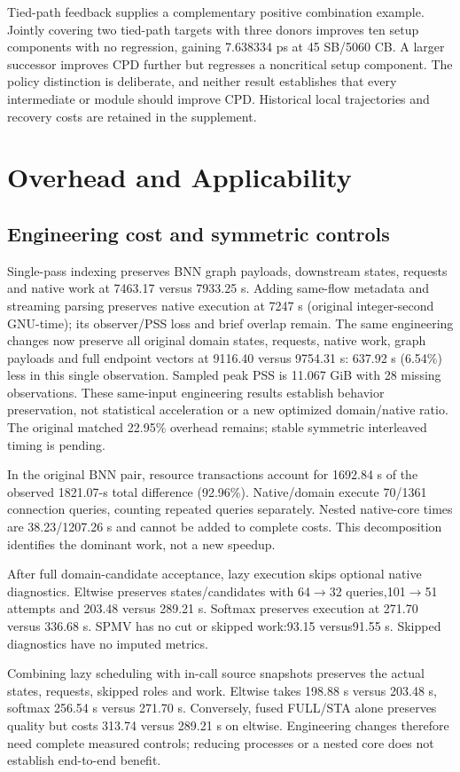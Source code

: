 \documentclass[conference,10pt]{IEEEtran}
\begin{document}
Tied-path feedback supplies a complementary positive combination example. Jointly covering two tied-path targets with three donors improves ten setup components with no regression, gaining 7.638334 ps at 45 SB/5060 CB. A larger successor improves CPD further but regresses a noncritical setup component. The policy distinction is deliberate, and neither result establishes that every intermediate or module should improve CPD. Historical local trajectories and recovery costs are retained in the supplement.
\section{Overhead and Applicability}
\subsection{Engineering cost and symmetric controls}
Single-pass indexing preserves BNN graph payloads, downstream states, requests and native work at 7463.17 versus 7933.25 s. Adding same-flow metadata and streaming parsing preserves native execution at 7247 s (original integer-second GNU-time); its observer/PSS loss and brief overlap remain. The same engineering changes now preserve all original domain states, requests, native work, graph payloads and full endpoint vectors at 9116.40 versus 9754.31 s: 637.92 s (6.54\%) less in this single observation. Sampled peak PSS is 11.067 GiB with 28 missing observations. These same-input engineering results establish behavior preservation, not statistical acceleration or a new optimized domain/native ratio. The original matched 22.95\% overhead remains; stable symmetric interleaved timing is pending.

In the original BNN pair, resource transactions account for 1692.84 s of the observed 1821.07-s total difference (92.96\%). Native/domain execute 70/1361 connection queries, counting repeated queries separately. Nested native-core times are 38.23/1207.26 s and cannot be added to complete costs. This decomposition identifies the dominant work, not a new speedup.

After full domain-candidate acceptance, lazy execution skips optional native diagnostics. Eltwise preserves states/candidates with 64$\to$32 queries,101$\to$51 attempts and 203.48 versus 289.21 s. Softmax preserves execution at 271.70 versus 336.68 s. SPMV has no cut or skipped work:93.15 versus91.55 s. Skipped diagnostics have no imputed metrics.

Combining lazy scheduling with in-call source snapshots preserves the actual states, requests, skipped roles and work. Eltwise takes 198.88 s versus 203.48 s, softmax 256.54 s versus 271.70 s. Conversely, fused FULL/STA alone preserves quality but costs 313.74 versus 289.21 s on eltwise. Engineering changes therefore need complete measured controls; reducing processes or a nested core does not establish end-to-end benefit.
\end{document}
